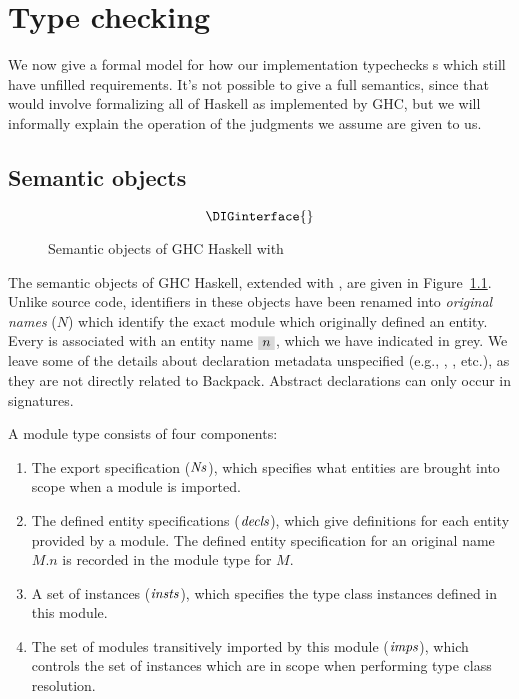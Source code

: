 \chapter{Type checking}
\label{sec:compiler}

We now give a formal model for how our implementation typechecks
\unit{}s which still have unfilled requirements.  It's not possible to
give a full semantics, since that would involve formalizing all of
Haskell as implemented by GHC, but we will informally explain the
operation of the judgments we assume are given to us.

\section{Semantic objects}

\begin{figure}
\[ \DIGinterface{} \]
\caption{Semantic objects of GHC Haskell with \Backpack{}}
\label{fig:semantic-objects}
\end{figure}

The semantic objects of GHC Haskell, extended with \Backpack{},
are given in Figure~\ref{fig:semantic-objects}.
Unlike source code, identifiers in these objects have been renamed into \emph{original names} ($N$) which identify the exact module which originally defined an entity.  Every  is associated with an entity name $\graybox{n}$, which we have indicated in grey.  We leave some of the details about declaration metadata unspecified (e.g., , , etc.), as they are not directly related to Backpack.  Abstract declarations can only occur in signatures.

A module type consists of four components:

\begin{enumerate}
    \item The export specification ($\mathit{Ns}$), which specifies what entities are brought
    into scope when a module is imported.
    \item The defined entity specifications ($\mathit{decls}$), which give definitions
    for each entity provided by a module.  The defined entity specification for
    an original name $M.n$ is recorded in the module type for $M$.
    \item A set of instances ($\mathit{insts}$), which specifies the type class
    instances defined in this module.
    \item The set of modules transitively imported by this module ($\mathit{imps}$),
    which controls the set of instances which are in scope when performing
    type class resolution.
\end{enumerate}

